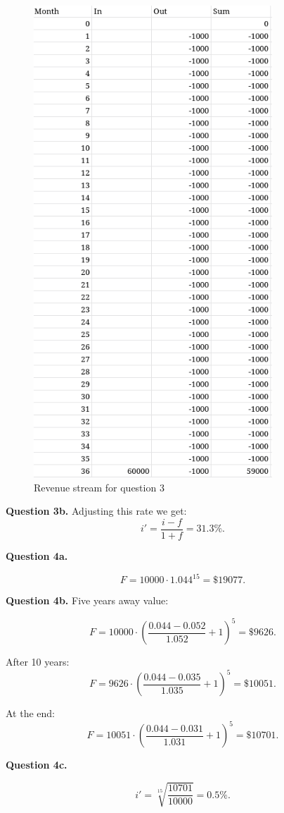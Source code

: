 \documentclass[letterpaper, reqno,11pt]{article}
\begin{document}
\begin{figure}[htpb]
    \centering
    \includegraphics[width=0.8\textwidth]{q3}
    \caption{Revenue stream for question 3}
    \label{fig:q3}
\end{figure}

{\noindent\bf Question 3b.} Adjusting this rate we get: 
\[
i'=\frac{i-f}{1+f}=31.3\%
.\]

{\noindent\bf Question 4a.} 

\[
F=10000\cdot 1.044^{15}=\$19077
.\]

{\noindent\bf Question 4b.} Five years away value: 

\[
F=10000\cdot (\frac{0.044-0.052}{1.052}+1)^5=\$9626
.\]

After 10 years: 
\[
F=9626\cdot(\frac{0.044-0.035}{1.035}+1)^5=\$10051
.\]

At the end: 
\[
F=10051\cdot(\frac{0.044-0.031}{1.031}+1)^5=\$10701
.\]

{\noindent\bf Question 4c.} 

\[
    i'=\sqrt[15]{\frac{10701}{10000}}=0.5\%
.\]
\end{document}
